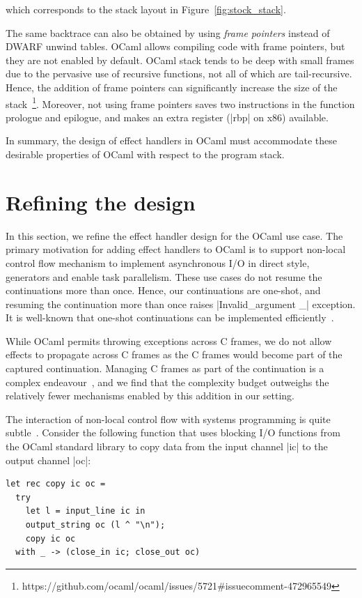 \documentclass[sigplan,10pt,review,anonymous]{acmart}\settopmatter{printfolios=true,printccs=false,printacmref=false}
\begin{document}
\noindent which corresponds to the stack layout in
Figure~\ref{fig:stock_stack}.

The same backtrace can also be obtained by using \emph{frame pointers} instead
of DWARF unwind tables. OCaml allows compiling code with frame pointers, but
they are not enabled by default. OCaml stack tends to be deep with small frames
due to the pervasive use of recursive functions, not all of which are
tail-recursive. Hence, the addition of frame pointers can significantly
increase the size of the
stack~\footnote{https://github.com/ocaml/ocaml/issues/5721\#issuecomment-472965549}.
Moreover, not using frame pointers saves two instructions in the function
prologue and epilogue, and makes an extra register (|rbp| on x86) available.

In summary, the design of effect handlers in OCaml must accommodate these
desirable properties of OCaml with respect to the program stack.

\section{Refining the design}
\label{sec:refine}

In this section, we refine the effect handler design for the OCaml use case.
The primary motivation for adding effect handlers to OCaml is to support
non-local control flow mechanism to implement asynchronous I/O in direct style,
generators and enable task parallelism. These use cases do not resume the
continuations more than once. Hence, our continuations are one-shot, and
resuming the continuation more than once raises |Invalid_argument _| exception.
It is well-known that one-shot continuations can be implemented
efficiently~\cite{Bruggeman96RepresentingControl}.

While OCaml permits throwing exceptions across C frames, we do not allow
effects to propagate across C frames as the C frames would become part of the
captured continuation. Managing C frames as part of the continuation is a
complex endeavour~\cite{Daan17Aplas}, and we find that the complexity budget
outweighs the relatively fewer mechanisms enabled by this addition in our
setting.

The interaction of non-local control flow with systems programming is quite
subtle~\cite{TFP17}. Consider the following function that uses blocking I/O
functions from the OCaml standard library to copy data from the input channel
|ic| to the output channel |oc|:

\begin{lstlisting}
let rec copy ic oc =
  try
    let l = input_line ic in
    output_string oc (l ^ "\n");
    copy ic oc
  with _ -> (close_in ic; close_out oc)
\end{lstlisting}
\end{document}
